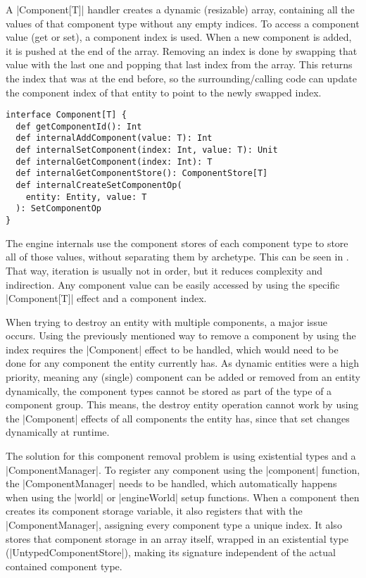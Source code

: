 A |Component[T]| handler creates a dynamic (resizable) array, containing all the values of that component type without any empty indices. To access a component value (get or set), a component index is used. When a new component is added, it is pushed at the end of the array. Removing an index is done by swapping that value with the last one and popping that last index from the array. This returns the index that was at the end before, so the surrounding/calling code can update the component index of that entity to point to the newly swapped index.

\begin{lstlisting}[caption=Component signature]
interface Component[T] {
  def getComponentId(): Int
  def internalAddComponent(value: T): Int
  def internalSetComponent(index: Int, value: T): Unit
  def internalGetComponent(index: Int): T
  def internalGetComponentStore(): ComponentStore[T]
  def internalCreateSetComponentOp(
    entity: Entity, value: T
  ): SetComponentOp
}
\end{lstlisting}

The engine internals use the component stores of each component type to store all of those values, without separating them by archetype. This can be seen in . That way, iteration is usually not in order, but it reduces complexity and indirection. Any component value can be easily accessed by using the specific |Component[T]| effect and a component index.

When trying to destroy an entity with multiple components, a major issue occurs. Using the previously mentioned way to remove a component by using the index requires the |Component| effect to be handled, which would need to be done for any component the entity currently has. As dynamic entities were a high priority, meaning any (single) component can be added or removed from an entity dynamically, the component types cannot be stored as part of the type of a component group. This means, the destroy entity operation cannot work by using the |Component| effects of all components the entity has, since that set changes dynamically at runtime.

The solution for this component removal problem is using existential types and a |ComponentManager|. To register any component using the |component| function, the |ComponentManager| needs to be handled, which automatically happens when using the |world| or |engineWorld| setup functions. When a component then creates its component storage variable, it also registers that with the |ComponentManager|, assigning every component type a unique index. It also stores that component storage in an array itself, wrapped in an existential type (|UntypedComponentStore|), making its signature independent of the actual contained component type.

